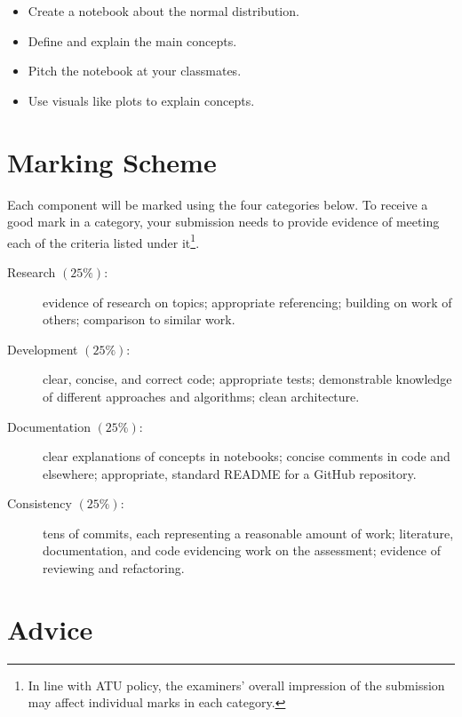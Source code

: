 \documentclass[a4paper]{tufte-handout}
\begin{document}
\begin{itemize}
  \item Create a notebook about the normal distribution.
  \item Define and explain the main concepts.
  \item Pitch the notebook at your classmates.
  \item Use visuals like plots to explain concepts.
\end{itemize}


\section{Marking Scheme}
Each component will be marked using the four categories below.
To receive a good mark in a category, your submission needs to provide evidence of meeting each of the criteria listed under it\footnote{In line with ATU policy, the examiners' overall impression of the submission may affect individual marks in each category.}.

\begin{description}
  \item[Research $(25\%)$:] evidence of research on topics; appropriate referencing; building on work of others; comparison to similar work.
  \item[Development $(25\%)$:] clear, concise, and correct code; appropriate tests; demonstrable knowledge of different approaches and algorithms; clean architecture.
  \item[Documentation $(25\%)$:] clear explanations of concepts in notebooks; concise comments in code and elsewhere; appropriate, standard README for a GitHub repository.
  \item[Consistency $(25\%)$:] tens of commits, each representing a reasonable amount of work; literature, documentation, and code evidencing work on the assessment; evidence of reviewing and refactoring.
\end{description}


\section{Advice}
\end{document}
